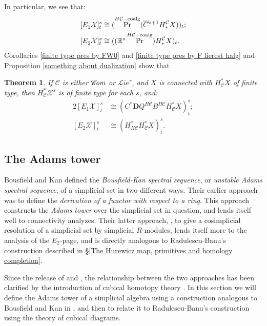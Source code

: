 \documentclass[11pt]{amsart} \renewcommand{\baselinestretch}{1.2}
\theoremstyle{plain}
\newtheorem{thm}{Theorem}[section] %
\numberwithin{equation}{section} %
\theoremstyle{plain}
\newtheorem{thm}{Theorem}[chapter] %
\numberwithin{equation}{chapter} %
\DeclareMathOperator{\Prim}{Pr}
\newcommand{\scrL}{\mathscr{L}}
\newcommand{\scrC}{\mathscr{C}}
\newcommand{\calx}{\mathcal{X}}
\newcommand{\calc}{\mathcal{C}}
\newcommand{\HA}[1]{H#1}
\newcommand{\HC}[1]{H#1\mathrm{-coalg}}
\newcommand{\algs}{{\scrC\!\textit{\normalfont\textit{om}}}}
\newcommand{\restliealgs}{{\scrL\!\textit{ie}^\textit{r}}}
\newcommand{\algcat}{{\calc}}%
\newcommand{\Edownup}[5]{[E_{#1}^{#2}#3]^{#4}_{#5}}
\newcommand{\dual}{\mathbf{D}}
\newcommand{\SubsectionOrSection}[1]{\subsection{#1}}
\begin{document}
\begin{Bousfield-Kan spectral sequence}
In particular, we see that:
\begin{alignat*}{2}
\Edownup{1}{}{\calx}{s}{t}&\cong (\Prim^{\HC{\calc}}(\smash{\overline{C}}^{s+1}H_*^{\algcat}X))_{t};\\
\Edownup{2}{}{\calx}{s}{t}&\cong((\mathbb{R}^s\Prim^{\HC{\calc}})H_*^{\algcat}X)_t.
\end{alignat*}
Corollaries \ref{finite type pres by FW0} and \ref{finite type pres by F lierest halg} and Proposition \ref{something about dualization} show that
\begin{thm}
\label{identify E2 with derived Q}
If $\algcat$ is either $\algs$ or $\restliealgs$, and $X$ is connected with $H^*_\calc X$  of finite type, then $H^*_\calc\calx^s$ is of finite type for each $s$, and:
\begin{alignat*}{2}
\Edownup{1}{}{\calx}{s}{t}&\cong (C^*\dual Q^{\HA{\algcat}} B^{\HA{\algcat}} H^*_{\algcat}X)^{s}_{t};\\
\Edownup{2}{}{\calx}{s}{t}&\cong (H^*_{\HA{\algcat}}H^*_{\algcat}X)^{s}_{t}.
\end{alignat*}
\end{thm}





\SubsectionOrSection{The Adams tower}\label{sec:derWRTab}\label{sec:relnWithRB}
Bousfield and Kan defined the \emph{Bousfield-Kan spectral sequence}, or \emph{unstable Adams spectral sequence}, of a simplicial set in two different ways. Their earlier approach \cite{BK_pairings.pdf} was to define the \emph{derivation of a functor with respect to a ring}. This approach constructs the \emph{Adams tower} over the simplicial set in question, and lends itself well to connectivity analyzes. Their latter approach, \cite{BousKanSSeq.pdf}, to give a cosimplicial resolution of a simplicial set by simplicial $R$-modules, lends itself more to the analysis of the $E_2$-page, and is directly analogous to Radulescu-Banu's construction described in \S\ref{The Hurewicz map, primitives and homology completion}.

Since the release of \cite{BK_pairings.pdf} and \cite{BousKanSSeq.pdf}, the relationship between the two approaches has been clarified by the introduction of cubical homotopy theory \cite{GoodwillieCalcII}. In this section we will define the Adams tower of a simplicial algebra using a construction analogous to Bousfield and Kan in \cite{BK_pairings.pdf}, and then to relate it to Radulescu-Banu's construction using the theory of cubical diagrams. 



\end{Bousfield-Kan spectral sequence}
\end{document}
